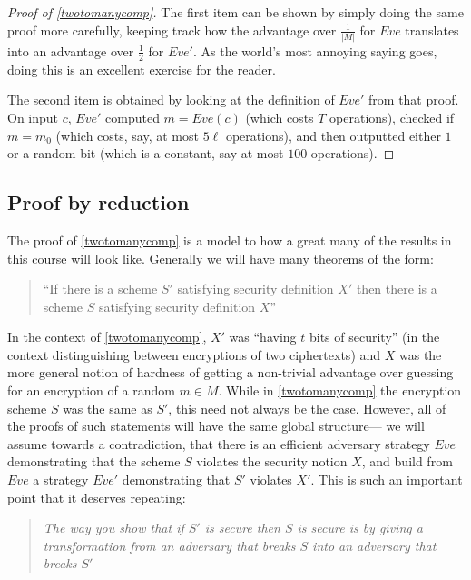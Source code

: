 \begin{proof}[Proof of \cref{twotomanycomp}]
The first item can be shown by simply doing the same proof more
carefully, keeping track how the advantage over \(\tfrac{1}{|M|}\) for
\(Eve\) translates into an advantage over \(\tfrac{1}{2}\) for \(Eve'\).
As the world's most annoying saying goes, doing this is an excellent
exercise for the reader.

The second item is obtained by looking at the definition of \(Eve'\)
from that proof. On input \(c\), \(Eve'\) computed \(m=Eve(c)\) (which
costs \(T\) operations), checked if \(m=m_0\) (which costs, say, at most
\(5\ell\) operations), and then outputted either \(1\) or a random bit
(which is a constant, say at most \(100\) operations).

\end{proof}

\subsection{Proof by reduction}\label{2-Proof-by-reduction}

The proof of \cref{twotomanycomp} is a model to how a great many of the
results in this course will look like. Generally we will have many
theorems of the form:

\begin{quote}
``If there is a scheme \(S'\) satisfying security definition \(X'\) then
there is a scheme \(S\) satisfying security definition \(X\)''
\end{quote}

In the context of \cref{twotomanycomp}, \(X'\) was ``having \(t\) bits
of security'' (in the context distinguishing between encryptions of two
ciphertexts) and \(X\) was the more general notion of hardness of
getting a non-trivial advantage over guessing for an encryption of a
random \(m\in M\). While in \cref{twotomanycomp} the encryption scheme
\(S\) was the same as \(S'\), this need not always be the case. However,
all of the proofs of such statements will have the same global
structure--- we will assume towards a contradiction, that there is an
efficient adversary strategy \(Eve\) demonstrating that the scheme \(S\)
violates the security notion \(X\), and build from \(Eve\) a strategy
\(Eve'\) demonstrating that \(S'\) violates \(X'\). This is such an
important point that it deserves repeating:

\begin{quote}
\emph{The way you show that if \(S'\) is secure then \(S\) is secure is
by giving a transformation from an adversary that breaks \(S\) into an
adversary that breaks \(S'\)}
\end{quote}

